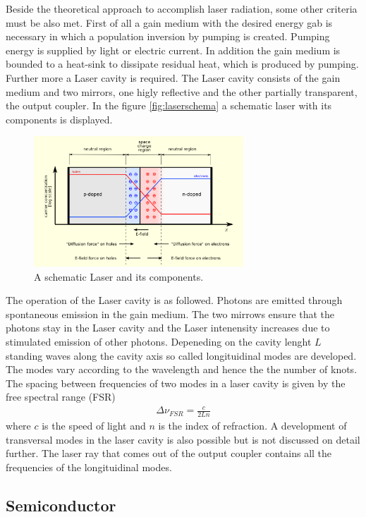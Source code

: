 Beside the theoretical approach to
accomplish laser radiation, some other criteria
must be also met.
First of all a gain medium with the desired
energy gab is necessary in which
a population inversion by pumping is created.
Pumping energy is supplied by light or electric current.
In addition the gain medium is bounded to a heat-sink
to dissipate residual heat, which is produced by pumping.
Further more a Laser cavity is required.
The Laser cavity consists of the gain medium and two
mirrors, one higly reflective and the other
partially transparent,
the output coupler.
In the figure \ref{fig:laserschema}
a schematic laser with its components is displayed.
\begin{figure}
\centering
\includegraphics[width=0.7\textwidth]{equilibrium.png}
\caption{A schematic Laser and its components.
\cite{wiki_diode}}
\label{fig:equi}
\end{figure}
The operation of the Laser cavity is as followed.
Photons are emitted through spontaneous emission
in the gain medium. The two mirrows
ensure that the photons stay in the Laser cavity
and the Laser intenensity increases due to
stimulated emission of other photons.
Depeneding on the cavity lenght $L$
standing waves along the cavity axis so called longituidinal modes
are developed.
The modes vary according to the wavelength and hence
the the number of knots. The spacing
between frequencies of two modes in a laser
cavity is given by the free spectral range (FSR)
\begin{align}
\Delta \nu_{FSR} = \frac{c}{2Ln}
\end{align}
where $c$ is the speed of light and $n$ is
the index of refraction.
A development of transversal modes in the laser cavity
is also possible but is not discussed on detail further.
The laser ray that comes out of the output coupler
contains all the frequencies of the longituidinal modes.

\subsection{Semiconductor}
\label{subsec:Semiconductor}

